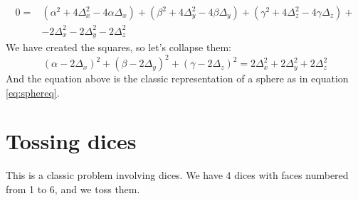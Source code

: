 \begin{equation*}
    \begin{split}
        0 = &(\alpha^2 + 4\Delta^2_x - 4\alpha\Delta_x) +
            (\beta^2 + 4\Delta^2_y - 4\beta\Delta_y) +
            (\gamma^2 + 4\Delta^2_z - 4\gamma\Delta_z) +\\
            &- 2\Delta^2_x - 2\Delta^2_y - 2\Delta^2_z
    \end{split}
\end{equation*}
We have created the squares, so let's collapse them:
\begin{equation*}
    (\alpha - 2\Delta_x)^2 + (\beta - 2\Delta_y)^2 + (\gamma - 2\Delta_z)^2 =
        2\Delta^2_x + 2\Delta^2_y + 2\Delta^2_z
\end{equation*}
And the equation above is the classic representation of a sphere as in
equation \ref{eq:sphereq}.

\section{Tossing dices}
\label{sec:dices}
This is a classic problem involving dices. We have 4
dices with faces numbered from
1 to 6, and we toss them.

